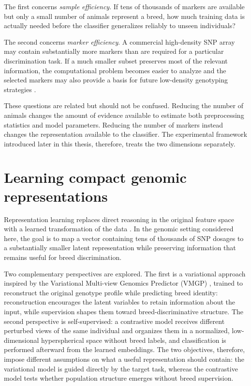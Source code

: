 The first concerns \emph{sample efficiency}. If tens of thousands of
markers are available but only a small number of animals represent a
breed, how much training data is actually needed before the classifier
generalizes reliably to unseen individuals?

The second concerns \emph{marker efficiency}. A commercial
high-density SNP array may contain substantially more markers than are
required for a particular discrimination task. If a much smaller
subset preserves most of the relevant information, the computational
problem becomes easier to analyze and the selected markers may also
provide a basis for future low-density genotyping strategies
\cite{dimauro2013canonical, dimauro2015sheep}.

These questions are related but should not be confused. Reducing the
number of animals changes the amount of evidence available to estimate
both preprocessing statistics and model parameters. Reducing the
number of markers instead changes the representation available to the
classifier. The experimental framework introduced later in this
thesis, therefore, treats the two dimensions separately.

\section{Learning compact genomic representations}
\label{sec:representation_learning}

Representation learning replaces direct reasoning in the original
feature space with a learned transformation of the data
\cite{bengio2013representation}. In the genomic setting considered
here, the goal is to map a vector containing tens of thousands of SNP
dosages to a substantially smaller latent representation while
preserving information that remains useful for breed discrimination.

Two complementary perspectives are explored. The first is a
variational approach inspired by the Variational Multi-view Genomics
Predictor (VMGP) \cite{zhao2025vmgp}, trained to reconstruct the
original genotype profile while predicting breed identity:
reconstruction encourages the latent variables to retain information
about the input, while supervision shapes them toward
breed-discriminative structure. The second perspective is
self-supervised: a contrastive model receives different perturbed
views of the same individual and organizes them in a normalized,
low-dimensional hyperspherical space without breed labels, and
classification is performed afterward from the learned embeddings.
The two objectives, therefore, impose different assumptions on what a
useful representation should contain: the variational model is guided
directly by the target task, whereas the contrastive model tests
whether population structure emerges without breed supervision.

